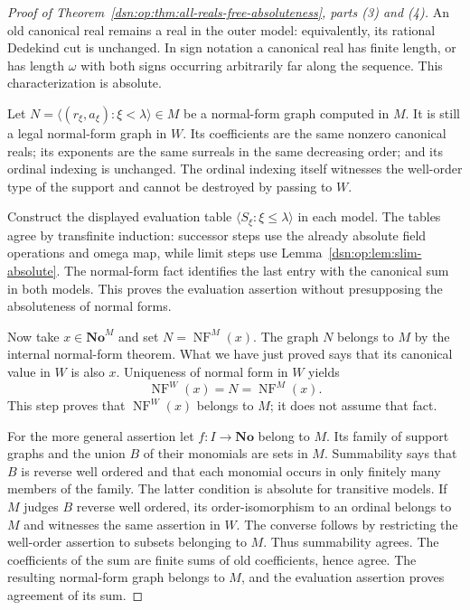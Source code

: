 \documentclass[11pt,a4paper]{article}
\numberwithin{equation}{section}
\theoremstyle{definition}
\theoremstyle{remark}
\newcommand{\No}{\mathbf{No}}
\begin{document}
\begin{proof}[Proof of Theorem~\ref{dsn:op:thm:all-reals-free-absoluteness},
parts (3) and (4)]
An old canonical real remains a real in the outer model: equivalently,
its rational Dedekind cut is unchanged.  In sign notation a canonical
real has finite length, or has length $\omega$ with both signs occurring
arbitrarily far along the sequence.  This characterization is absolute.

Let
$N=\langle(r_\xi,a_\xi):\xi<\lambda\rangle\in M$ be a normal-form
graph computed in $M$.  It is still a legal normal-form graph in $W$.
Its coefficients are the same nonzero canonical reals; its exponents
are the same surreals in the same decreasing order; and its ordinal
indexing is unchanged.  The ordinal indexing itself witnesses the
well-order type of the support and cannot be destroyed by passing to
$W$.

Construct the displayed evaluation table $\langle S_\xi:
\xi\leq\lambda\rangle$ in each model.  The tables agree by transfinite
induction: successor steps use the already absolute field operations
and omega map, while limit steps use
Lemma~\ref{dsn:op:lem:slim-absolute}.  The normal-form fact identifies the last
entry with the canonical sum in both models.  This proves the
evaluation assertion without presupposing the absoluteness of normal
forms.

Now take $x\in\No^M$ and set $N=\operatorname{NF}^M(x)$.
The graph $N$ belongs to $M$ by the internal normal-form theorem.  What
we have just proved says that its canonical value in $W$ is also $x$.
Uniqueness of normal form in $W$ yields
\[
 \operatorname{NF}^W(x)=N=\operatorname{NF}^M(x).
\]
This step proves that $\operatorname{NF}^W(x)$ belongs to $M$; it does
not assume that fact.

For the more general assertion let $f:I\to\No$ belong to $M$.
Its family of support graphs and the union $B$ of their monomials are
sets in $M$.  Summability says that $B$ is reverse well ordered and
that each monomial occurs in only finitely many members of the family.
The latter condition is absolute for transitive models.  If $M$ judges
$B$ reverse well ordered, its order-isomorphism to an ordinal belongs
to $M$ and witnesses the same assertion in $W$.  The converse follows
by restricting the well-order assertion to subsets belonging to $M$.
Thus summability agrees.  The coefficients of the sum are finite sums
of old coefficients, hence agree.  The resulting normal-form graph
belongs to $M$, and the evaluation assertion proves agreement of its
sum.
\end{proof}
\end{document}

